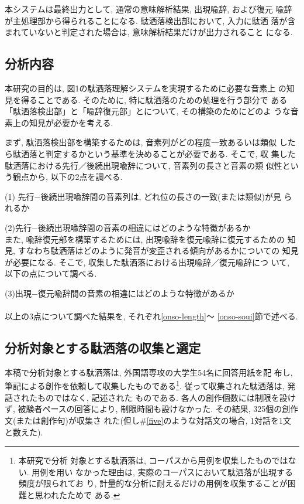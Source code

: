 本システムは最終出力として, 通常の意味解析結果, 出現喩辞, および復元
喩辞が主処理部から得られることになる. 駄洒落検出部において, 入力に駄洒
落が含まれていないと判定された場合は, 意味解析結果だけが出力されること
になる.  

\subsection{分析内容}

  本研究の目的は, 図1の駄洒落理解システムを実現するために必要な音素上
の知見を得ることである. そのために, 特に駄洒落のための処理を行う部分で
ある「駄洒落検出部」と「喩辞復元部」とについて, その構築のためにどのよ
うな音素上の知見が必要かを考える.

まず, 駄洒落検出部を構築するためは, 音素列がどの程度一致あるいは類似
したら駄洒落と判定するかという基準を決めることが必要である. そこで, 収
集した駄洒落における先行／後続出現喩辞について, 音素列の長さと音素の類
似性という観点から, 以下の2点を調べる.\vspace*{1em}

(1) 先行−後続出現喩辞間の音素列は, どれ位の長さの一致(または類似)が見
られるか

(2)先行−後続出現喩辞間の音素の相違にはどのような特徴があるか
\vspace*{1em}\\ 
また, 喩辞復元部を構築するためには, 出現喩辞を復元喩辞に復元するための
知見, すなわち駄洒落はどのように発音が変歪される傾向があるかについての
知見が必要になる. そこで, 収集した駄洒落における出現喩辞／復元喩辞につ
いて, 以下の点について調べる.\vspace*{1em}

(3)出現−復元喩辞間の音素の相違にはどのような特徴があるか\\
\ \\
\vspace{-1mm}
以上の3点について調べた結果を, それぞれ\ref{onso-length}〜
\ref{onso-soui}節で述べる.  

\subsection{分析対象とする駄洒落の収集と選定}

本稿で分析対象とする駄洒落は, 外国語専攻の大学生54名に回答用紙を配
布し, 筆記による創作を依頼して収集したものである\footnote{本研究で分析
対象とする駄洒落は, コーパスから用例を収集したものではない. 用例を用い
なかった理由は, 実際のコーパスにおいて駄洒落が出現する頻度が限られてお
り, 計量的な分析に耐えるだけの用例を収集することが困難と思われたためで
ある. }. 従って収集された駄洒落は, 発話されたものではなく, 記述された
ものである. 各人の創作個数には制限を設けず, 被験者ペースの回答により, 
制限時間も設けなかった. その結果, 325個の創作文(または創作句)が収集さ
れた(但し\#\ref{five}のような対話文の場合, 1対話を1文と数えた). 

